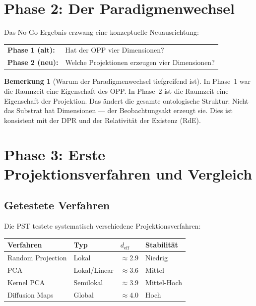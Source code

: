 \documentclass[11pt,a4paper]{article}
\theoremstyle{plain}
\theoremstyle{definition}
\newtheorem{remark}{Bemerkung}[section]
\newcommand{\deff}{d_{\mathrm{eff}}}
\begin{document}
\section{Phase 2: Der Paradigmenwechsel}

Das No-Go Ergebnis erzwang eine konzeptuelle Neuausrichtung:

\begin{center}
\begin{tabular}{ll}
  \toprule
  \textbf{Phase 1 (alt):} & Hat der OPP vier Dimensionen? \\
  \textbf{Phase 2 (neu):} & Welche Projektionen erzeugen vier Dimensionen? \\
  \bottomrule
\end{tabular}
\end{center}

\begin{remark}[Warum der Paradigmenwechsel tiefgreifend ist]
In Phase~1 war die Raumzeit eine Eigenschaft des OPP. In Phase~2 ist
die Raumzeit eine Eigenschaft der Projektion. Das \"{a}ndert die gesamte
ontologische Struktur: Nicht das Substrat hat Dimensionen --- der
Beobachtungsakt erzeugt sie. Dies ist konsistent mit der DPR und der
Relativit\"{a}t der Existenz (RdE).
\end{remark}

\section{Phase 3: Erste Projektionsverfahren und Vergleich}

\subsection{Getestete Verfahren}

Die PST testete systematisch verschiedene Projektionsverfahren:

\begin{center}
\begin{tabular}{llll}
  \toprule
  \textbf{Verfahren} & \textbf{Typ} & \textbf{$\deff$} &
  \textbf{Stabilit\"{a}t} \\
  \midrule
  Random Projection & Lokal & $\approx 2.9$ & Niedrig \\
  PCA & Lokal/Linear & $\approx 3.6$ & Mittel \\
  Kernel PCA & Semilokal & $\approx 3.9$ & Mittel-Hoch \\
  Diffusion Maps & Global & $\approx 4.0$ & Hoch \\
  \bottomrule
\end{tabular}
\end{center}
\end{document}
